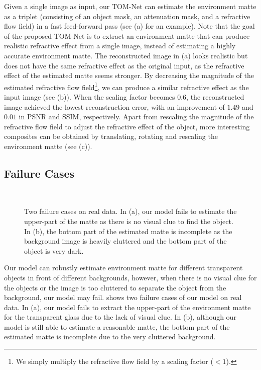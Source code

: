 Given a single image as input, our TOM-Net can estimate the environment matte as a triplet (consisting of an object mask, an attenuation mask, and a refractive flow field) in a fast feed-forward pass (see  (a) for an example).
Note that the goal of the proposed TOM-Net is to extract an environment matte that can produce realistic refractive effect from a single image, instead of estimating a highly accurate environment matte. 
The reconstructed image in  (a) looks realistic but does not have the same refractive effect as the original input, as the refractive effect of the estimated matte seems stronger. 
By decreasing the magnitude of the estimated refractive flow field\footnote{We simply multiply the refractive flow field by a scaling factor ($<1$).}, we can produce a similar refractive effect as the input image (see  (b)). When the scaling factor becomes $0.6$, the reconstructed image achieved the lowest reconstruction error, with an improvement of $1.49$ and $0.01$ in PSNR and SSIM, respectively.
Apart from rescaling the magnitude of the refractive flow field to adjust the refractive effect of the object, more interesting composites can be obtained by translating, rotating and rescaling the environment matte (see  (c)). 

\subsection{Failure Cases}
\label{sec:Failure Cases}

\begin{figure}[htbp] \centering
    \makebox[0.05\textwidth]{\footnotesize } 
     \\
    
    \caption[Failure cases on real data]{Two failure cases on real data. In (a), our model fails to estimate the upper-part of the matte as there is no visual clue to find the object. In (b), the bottom part of the estimated matte is incomplete as the background image is heavily cluttered and the bottom part of the object is very dark.}
    \label{fig:sup_fail}
\end{figure}

Our model can robustly estimate environment matte for different transparent objects in front of different backgrounds, however, when there is no visual clue for the objects or the image is too cluttered to separate the object from the background, our model may fail.  shows two failure cases of our model on real data. In  (a), our model fails to extract the upper-part of the environment matte for the transparent glass due to the lack of visual clue. 
In  (b), although our model is still able to estimate a reasonable matte, the bottom part of the estimated matte is incomplete due to the very cluttered background. 



